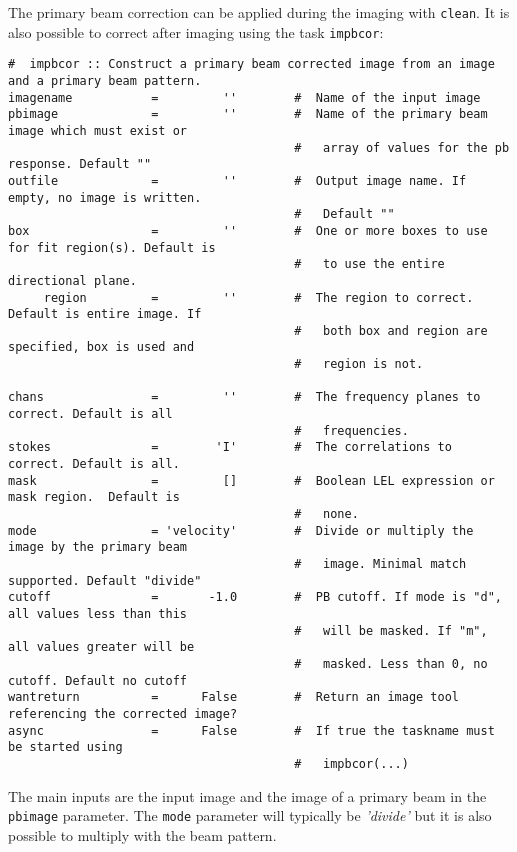 The primary beam correction can be applied during the imaging with {\tt clean}. It is also possible to correct after imaging using the task {\tt impbcor}:

\small
\begin{verbatim}
#  impbcor :: Construct a primary beam corrected image from an image and a primary beam pattern.
imagename           =         ''        #  Name of the input image
pbimage             =         ''        #  Name of the primary beam image which must exist or
                                        #   array of values for the pb response. Default ""
outfile             =         ''        #  Output image name. If empty, no image is written.
                                        #   Default ""
box                 =         ''        #  One or more boxes to use for fit region(s). Default is
                                        #   to use the entire directional plane.
     region         =         ''        #  The region to correct. Default is entire image. If
                                        #   both box and region are specified, box is used and
                                        #   region is not.

chans               =         ''        #  The frequency planes to correct. Default is all
                                        #   frequencies.
stokes              =        'I'        #  The correlations to correct. Default is all.
mask                =         []        #  Boolean LEL expression or mask region.  Default is
                                        #   none.
mode                = 'velocity'        #  Divide or multiply the image by the primary beam
                                        #   image. Minimal match supported. Default "divide"
cutoff              =       -1.0        #  PB cutoff. If mode is "d", all values less than this
                                        #   will be masked. If "m", all values greater will be
                                        #   masked. Less than 0, no cutoff. Default no cutoff
wantreturn          =      False        #  Return an image tool referencing the corrected image?
async               =      False        #  If true the taskname must be started using
                                        #   impbcor(...)
\end{verbatim}
\normalsize                             

The main inputs are the input image and the image of a primary beam in
the {\tt pbimage} parameter. The {\tt mode} parameter will typically
be {\it 'divide'} but it is also possible to multiply with the beam
pattern.

